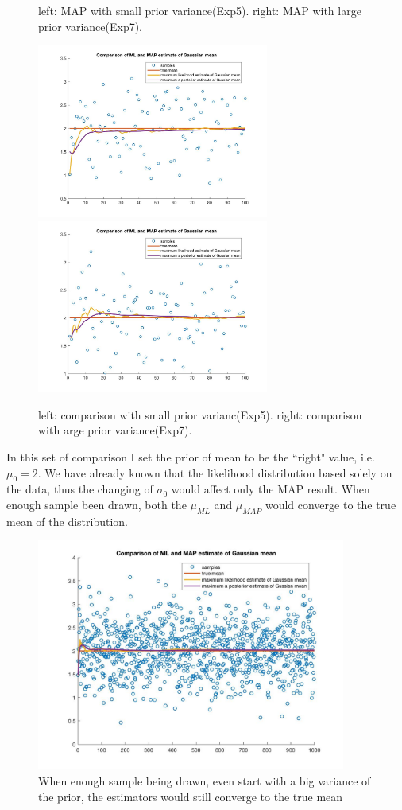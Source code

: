 \documentclass[a4paper]{article}
\begin{document}
\begin{spacing}{2.0}
\begin{itemize}
\begin{figure}[H]
	\caption{left: MAP with small prior variance(Exp5). right: MAP with large prior variance(Exp7).}
	\label{fig:side:b}
\end{figure}
\begin{figure}[H]
	\centering
	\includegraphics[width=3in]{100comparison5.jpg}
	\includegraphics[width=3in]{100comparison7.jpg}
	\caption{left: comparison with small prior varianc(Exp5). right: comparison with arge prior variance(Exp7).}
	\label{fig:side:b}
\end{figure}
In this set of comparison I set the prior of mean to be the ``right" value, i.e. $\mu_0 = 2$. We have already known that the likelihood distribution based solely on the data, thus the changing of $\sigma_0$ would affect only the MAP result. When enough sample been drawn, both the $\mu_{ML}$ and $\mu_{MAP}$ would converge to the true mean of the distribution. 
\begin{figure}[H]
	\centering
	\includegraphics[width=4in]{exp7toConverge.jpg}
	\caption{When enough sample being drawn, even start with a big variance of the prior, the estimators would still converge to the true mean}
	\label{fig:side:b}
\end{figure}


\end{itemize}
\end{spacing}
\end{document}
